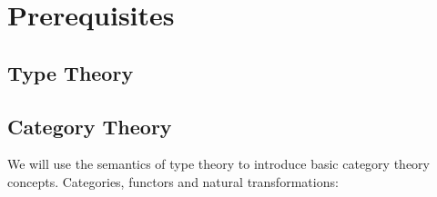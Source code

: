 \chapter{Prerequisites}

\section{Type Theory}

\section{Category Theory}

We will use the semantics of type theory to introduce basic category theory concepts. Categories, functors and natural transformations:

\begin{code}[hide]%
\>[0]\AgdaSymbol{\{-\#}\AgdaSpace{}%
\AgdaSpace{}%
\AgdaSpace{}%
\AgdaSpace{}%
\AgdaSymbol{\#-\}}\<%
\\
\>[0]\AgdaSpace{}%
\AgdaSpace{}%
\<%
\\
\>[0]\AgdaSpace{}%
\AgdaSpace{}%
\<%
\\
\>[0]\AgdaSpace{}%
\AgdaSpace{}%
\AgdaSpace{}%
\AgdaSpace{}%
\AgdaSymbol{(}\AgdaSpace{}%
\AgdaSpace{}%
\AgdaSymbol{)}\<%
\end{code}

